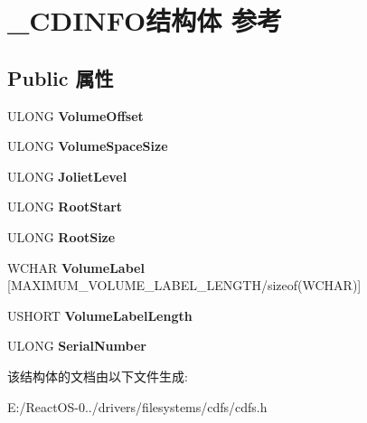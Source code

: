 \hypertarget{struct___c_d_i_n_f_o}{}\section{\+\_\+\+C\+D\+I\+N\+F\+O结构体 参考}
\label{struct___c_d_i_n_f_o}
\subsection*{Public 属性}
\begin{DoxyCompactItemize}
\item 
\mbox{\label{struct___c_d_i_n_f_o_a6851b12aff52efb96a36fce4313735c9}} 
U\+L\+O\+NG {\bfseries Volume\+Offset}
\item 
\mbox{\label{struct___c_d_i_n_f_o_a2d15da3770b3ff38fc03da2b663da190}} 
U\+L\+O\+NG {\bfseries Volume\+Space\+Size}
\item 
\mbox{\label{struct___c_d_i_n_f_o_aaa407e4ebcf617451aecefb805010682}} 
U\+L\+O\+NG {\bfseries Joliet\+Level}
\item 
\mbox{\label{struct___c_d_i_n_f_o_a93e4fadf618733752fdc34b5e02a498a}} 
U\+L\+O\+NG {\bfseries Root\+Start}
\item 
\mbox{\label{struct___c_d_i_n_f_o_ad54072f5d0242d4a7c5ed5cc063f7556}} 
U\+L\+O\+NG {\bfseries Root\+Size}
\item 
\mbox{\label{struct___c_d_i_n_f_o_ad28eb36b71553c879760bcfb25113e5c}} 
W\+C\+H\+AR {\bfseries Volume\+Label} \mbox{[}M\+A\+X\+I\+M\+U\+M\+\_\+\+V\+O\+L\+U\+M\+E\+\_\+\+L\+A\+B\+E\+L\+\_\+\+L\+E\+N\+G\+TH/sizeof(W\+C\+H\+AR)\mbox{]}
\item 
\mbox{\label{struct___c_d_i_n_f_o_afb97f1b9c3b5dd6591606df73b4fcb21}} 
U\+S\+H\+O\+RT {\bfseries Volume\+Label\+Length}
\item 
\mbox{\label{struct___c_d_i_n_f_o_a692fe04b2db414d86b8231b6c8a5f553}} 
U\+L\+O\+NG {\bfseries Serial\+Number}
\end{DoxyCompactItemize}


该结构体的文档由以下文件生成\+:\begin{DoxyCompactItemize}
\item 
E\+:/\+React\+O\+S-\/0../drivers/filesystems/cdfs/cdfs.\+h\end{DoxyCompactItemize}
